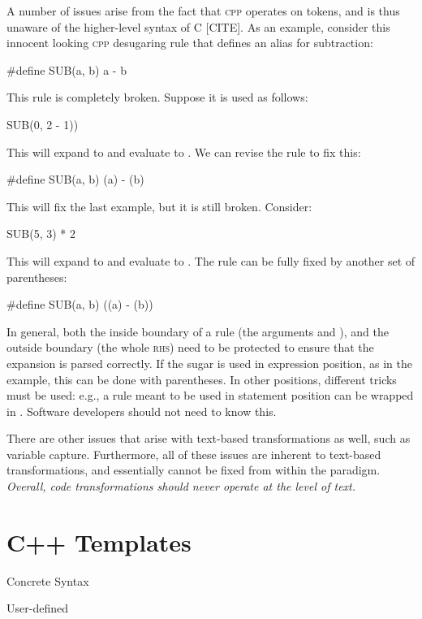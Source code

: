 A number of issues arise from the fact that \textsc{cpp} operates on tokens, and
is thus unaware of the higher-level syntax of C [CITE].
As an example, consider this innocent looking
\textsc{cpp} desugaring rule that defines an alias for subtraction:
\begin{codes}
  #define SUB(a, b) a - b
\end{codes}
This rule is completely broken. Suppose it is used as follows:
\begin{codes}
  SUB(0, 2 - 1))
\end{codes}
This will expand to  and evaluate to .
We can revise the rule to fix this:
\begin{codes}
  #define SUB(a, b) (a) - (b)
\end{codes}
This will fix the last example, but it is still broken. Consider:
\begin{codes}
  SUB(5, 3) * 2
\end{codes}
This will expand to  and evaluate to .
The rule can be fully fixed by another set of parentheses:
\begin{codes}
  #define SUB(a, b) ((a) - (b))
\end{codes}
In general, both the inside boundary of a rule (the arguments 
and ), and the outside boundary (the whole \textsc{rhs}) need
to be protected to ensure that the expansion is parsed correctly. If
the sugar is used in expression position, as in the 
example, this can be done with parentheses. In other positions,
different tricks must be used: e.g., a rule meant to be used in
statement position can be wrapped in .
Software developers should not need to know this.

There are other issues that arise with text-based transformations as
well, such as variable capture. Furthermore, all of these issues are
inherent to text-based transformations, and essentially cannot be
fixed from within the paradigm. \emph{Overall, code transformations
  should never operate at the level of text.}

\section{C++ Templates} \label{sec:cpp}

 Concrete Syntax

 User-defined

